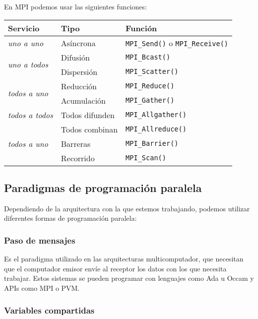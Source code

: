 En MPI podemos usar las siguientes funciones:

\begin{center}
\begin{tabular}{l l l}
	\textbf{Servicio} & \textbf{Tipo} & \textbf{Función} \\
	\toprule
	\textit{uno a uno} & Asíncrona & \texttt{MPI\_Send()} o \texttt{MPI\_Receive()} \\
	\midrule
	\multirow{2}{*}{\textit{uno a todos}} & Difusión   & \texttt{MPI\_Bcast()} \\
	                                      & Dispersión & \texttt{MPI\_Scatter()} \\
	\midrule
	\multirow{2}{*}{\textit{todos a uno}} & Reducción   & \texttt{MPI\_Reduce()} \\
	                                      & Acumulación & \texttt{MPI\_Gather()} \\
	\midrule
	\textit{todos a todos} & Todos difunden & \texttt{MPI\_Allgather()} \\
	\midrule
	\multirow{3}{*}{\textit{todos a uno}} & Todos combinan & \texttt{MPI\_Allreduce()} \\
	                                      & Barreras       & \texttt{MPI\_Barrier()} \\
	                                      & Recorrido      & \texttt{MPI\_Scan()} \\
\end{tabular}
\end{center}

\subsection{Paradigmas de programación paralela}\label{paradigmas-progpar}

Dependiendo de la arquitectura con la que estemos trabajando, podemos utilizar diferentes formas de programación paralela:

\subsubsection{Paso de mensajes}

Es el paradigma utilizado en las arquitecturas multicomputador, que necesitan que el computador emisor envíe al receptor los datos con los que necesita trabajar.
Estos sistemas se pueden programar con lenguajes como Ada u Occam y APIs como MPI o PVM\@.

\subsubsection{Variables compartidas}

